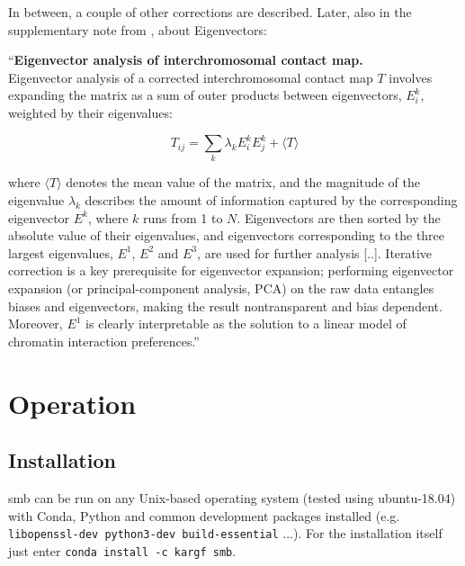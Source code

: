 \newpage

In between, a couple of other corrections are described. Later, also in the
supplementary note from \cite{imakaev2012iterative}, about Eigenvectors:



``\textbf{Eigenvector analysis of interchromosomal contact map.} \\
Eigenvector analysis of a corrected interchromosomal contact map $T$ involves
expanding the matrix as a sum of outer products between eigenvectors, $E^k_i$,
weighted by their eigenvalues:

$$ T_{ij} = \sum_k \lambda_k E^k_i E^k_j + \langle T \rangle$$

where $\langle T \rangle$ denotes the mean value of the matrix, and the
magnitude of the eigenvalue $\lambda_k$ describes the amount of information
captured by the corresponding eigenvector $E^k$, where $k$ runs from 1 to $N$.
Eigenvectors are then sorted by the absolute value of their eigenvalues, and
eigenvectors corresponding to the three largest eigenvalues, $E^1$, $E^2$ and
$E^3$, are used for further analysis [..]. Iterative correction is a key
prerequisite for eigenvector expansion; performing eigenvector expansion (or
principal-component analysis, PCA) on the raw data entangles biases and
eigenvectors, making the result nontransparent and bias dependent. Moreover,
$E^1$ is clearly interpretable as the solution to a linear model of chromatin
interaction preferences.''




\newpage
\section{Operation}\label{sec:operation}



\subsection{Installation}\label{sec:install}


smb can be run on any Unix-based operating system (tested using ubuntu-18.04)
with Conda, Python and common development packages installed (e.g.
\verb!libopenssl-dev python3-dev build-essential! ...). For the installation
itself just enter \verb|conda install -c kargf smb|.

